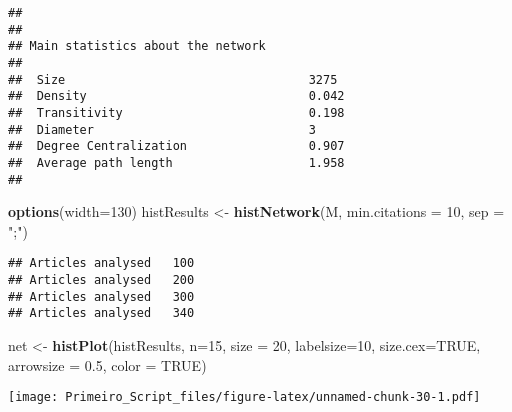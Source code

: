 \documentclass[]{article}
\newenvironment{Shaded}{\begin{snugshade}}{\end{snugshade}}
\newcommand{\DataTypeTok}[1]{\textcolor[rgb]{0.13,0.29,0.53}{#1}}
\newcommand{\DecValTok}[1]{\textcolor[rgb]{0.00,0.00,0.81}{#1}}
\newcommand{\FloatTok}[1]{\textcolor[rgb]{0.00,0.00,0.81}{#1}}
\newcommand{\KeywordTok}[1]{\textcolor[rgb]{0.13,0.29,0.53}{\textbf{#1}}}
\newcommand{\NormalTok}[1]{#1}
\newcommand{\OtherTok}[1]{\textcolor[rgb]{0.56,0.35,0.01}{#1}}
\newcommand{\StringTok}[1]{\textcolor[rgb]{0.31,0.60,0.02}{#1}}
\begin{document}
\begin{verbatim}
## 
## 
## Main statistics about the network
## 
##  Size                                  3275 
##  Density                               0.042 
##  Transitivity                          0.198 
##  Diameter                              3 
##  Degree Centralization                 0.907 
##  Average path length                   1.958 
## 
\end{verbatim}

\begin{Shaded}
\begin{Highlighting}[]
\KeywordTok{options}\NormalTok{(}\DataTypeTok{width=}\DecValTok{130}\NormalTok{)}
\NormalTok{histResults <-}\StringTok{ }\KeywordTok{histNetwork}\NormalTok{(M, }\DataTypeTok{min.citations =} \DecValTok{10}\NormalTok{, }\DataTypeTok{sep =} \StringTok{";"}\NormalTok{)}
\end{Highlighting}
\end{Shaded}

\begin{verbatim}
## Articles analysed   100 
## Articles analysed   200 
## Articles analysed   300 
## Articles analysed   340
\end{verbatim}

\begin{Shaded}
\begin{Highlighting}[]
\NormalTok{net <-}\StringTok{ }\KeywordTok{histPlot}\NormalTok{(histResults, }\DataTypeTok{n=}\DecValTok{15}\NormalTok{, }\DataTypeTok{size =} \DecValTok{20}\NormalTok{, }\DataTypeTok{labelsize=}\DecValTok{10}\NormalTok{, }\DataTypeTok{size.cex=}\OtherTok{TRUE}\NormalTok{, }\DataTypeTok{arrowsize =} \FloatTok{0.5}\NormalTok{, }\DataTypeTok{color =} \OtherTok{TRUE}\NormalTok{)}
\end{Highlighting}
\end{Shaded}

\texttt{[image: Primeiro\_Script\_files/figure-latex/unnamed-chunk-30-1.pdf]}
\end{document}
